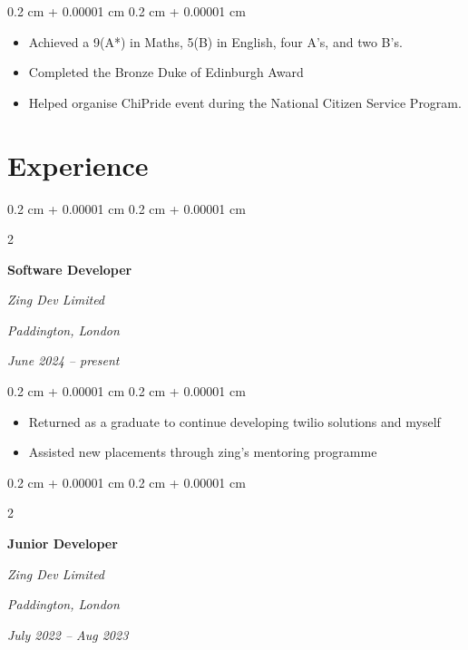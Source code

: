 \documentclass[10pt, letterpaper]{article}
\newenvironment{highlights}{
    \begin{itemize}[
        topsep=0.10 cm,
        parsep=0.10 cm,
        partopsep=0pt,
        itemsep=0pt,
        leftmargin=0.4 cm + 10pt
    ]
}{
    \end{itemize}
} %
\newenvironment{onecolentry}{
    \begin{adjustwidth}{
        0.2 cm + 0.00001 cm
    }{
        0.2 cm + 0.00001 cm
    }
}{
    \end{adjustwidth}
} %
\newenvironment{twocolentry}[2][]{
    \onecolentry
    \def\secondColumn{#2}
    \setcolumnwidth{\fill, 4.5 cm}
    \begin{paracol}{2}
}{
    \switchcolumn \raggedleft \secondColumn
    \end{paracol}
    \endonecolentry
} %
\begin{document}
        \vspace{0.10 cm}
        \begin{onecolentry}
            \begin{highlights}
                \item Achieved a 9(A*) in Maths, 5(B) in English, four A's, and two B's.
                \item Completed the Bronze Duke of Edinburgh Award
                \item Helped organise ChiPride event during the National Citizen Service Program.
            \end{highlights}
        \end{onecolentry}



    
    \section{Experience}



        
        \begin{twocolentry}{
        \textit{Paddington, London}    
            
        \textit{June 2024 – present}}
            \textbf{Software Developer}
            
            \textit{Zing Dev Limited}
        \end{twocolentry}

        \vspace{0.10 cm}
        \begin{onecolentry}
            \begin{highlights}
                \item Returned as a graduate to continue developing twilio solutions and myself
                \item Assisted new placements through zing's mentoring programme
            \end{highlights}
        \end{onecolentry}


        \vspace{0.2 cm}

        \begin{twocolentry}{
        \textit{Paddington, London}    
            
        \textit{July 2022 – Aug 2023}}
            \textbf{Junior Developer}
            
            \textit{Zing Dev Limited}
        \end{twocolentry}
\end{document}
